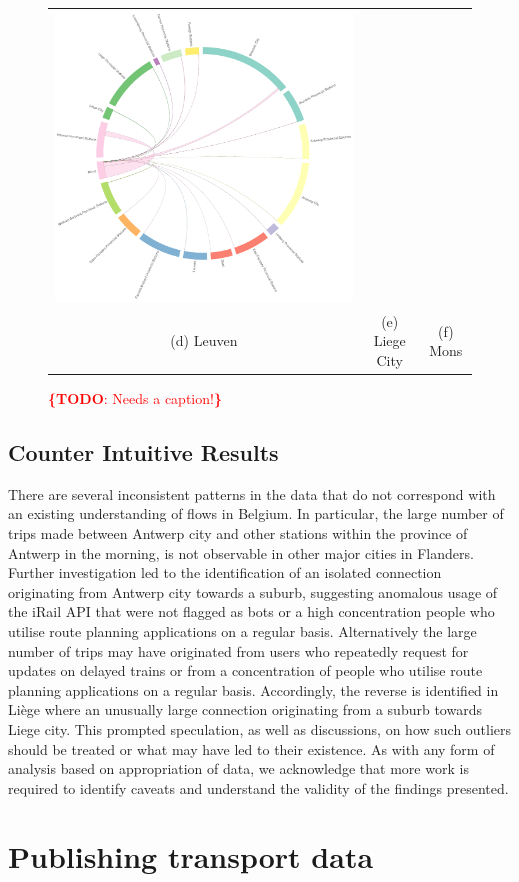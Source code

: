 \documentclass{sig-alternate}
\newcommand{\todo}[1]{\noindent\textcolor{red}{{\bf \{TODO}: #1{\bf \}}}}
\begin{document}
\begin{figure}[t]
\begin{tabular}{ccc}
  \includegraphics[width=.33\textwidth]{wd-mons.pdf}\\ 
  (d) Leuven&(e) Liege City&(f) Mons\\
\end{tabular}
\label{fig:cities}
\centering
\caption{\todo{Needs a caption!}}
\end{figure}


\subsection{Counter Intuitive Results}

There are several inconsistent patterns in the data that do not correspond with an existing understanding of flows in Belgium.
In particular, the large number of trips made between Antwerp city and other stations within the province of Antwerp in the morning, is not observable in other major cities in Flanders.
Further investigation led to the identification of an isolated connection originating from Antwerp city towards a suburb, suggesting anomalous usage of the iRail API that were not flagged as bots or a high concentration people who utilise route planning applications on a regular basis.
Alternatively the large number of trips may have originated from users who repeatedly request for updates on delayed trains or from a concentration of people who utilise route planning applications on a regular basis.
Accordingly, the reverse is identified in Liège where an unusually large connection originating from a suburb towards Liege city.
This prompted speculation, as well as discussions, on how such outliers should be treated or what may have led to their existence.
As with any form of analysis based on appropriation of data, we acknowledge that more work is required to identify caveats and understand the validity of the findings presented.

\section{Publishing transport data}
\label{sec:publishing}
\end{document}
